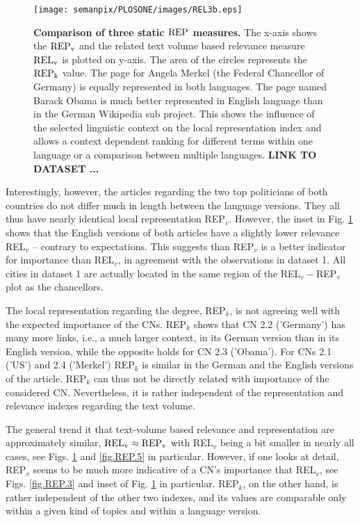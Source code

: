 \documentclass[a4paper,10pt]{scrbook}
\begin{document}
\begin{figure}[!b]
\begin{center}
\texttt{[image: semanpix/PLOSONE/images/REL3b.eps]}
\end{center}
\caption{
{\bf Comparison of three static $\rm REP$ measures.} The x-axis shows the $\rm
REP_v$ and the related text volume based relevance measure $\rm
REL_v$ is plotted on y-axis. The area of the circles represents the
$\rm REP_{k}$ value. The page for Angela Merkel (the Federal Chancellor of
Germany) is equally represented in both languages. The page named
Barack Obama is much better represented in English language than in the German Wikipedia sub project. This
shows the influence of the selected linguistic context on the local
representation index and allows a context dependent ranking for different terms
within one language or a comparison between multiple languages.
\textbf{LINK TO DATASET ...}}
\label{fig.REP.4}
\end{figure}


Interestingly, however, the articles regarding the two top politicians of 
both countries do not differ much in length between the language versions. 
They all thus have nearly identical local representation REP$_v$. However, 
the inset in Fig. \ref{fig.REP.4} shows that the English versions of both articles have 
a slightly lower relevance REL$_v$ -- contrary to expectations. This 
suggests than REP$_v$ is a better indicator for importance than REL$_v$,
in agreement with the observations in dataset 1. All cities in dataset 1 
are actually located in the same region of the REL$_v-$REP$_v$ plot as the 
chancellors. 

The local representation regarding the degree, REP$_k$, is not agreeing well 
with the expected importance of the CNs. REP$_k$ shows that CN 2.2 ('Germany') 
has many more links, i.e., a much larger context, in its German version than 
in its English version, while the opposite holds for CN 2.3 ('Obama'). For 
CNs 2.1 ('US') and 2.4 ('Merkel') REP$_k$ is similar in the German and the 
English versions of the article. REP$_k$ can thus not be directly related 
with importance of the considered CN. Nevertheless, it is rather independent 
of the representation and relevance indexes regarding the text volume.

The general trend it that text-volume based relevance and representation are 
approximately similar, $\rm REL_{v} \approx \rm REP_{v}$ with REL$_v$ being a 
bit smaller in nearly all cases, see Figs. \ref{fig.REP.4} and \ref{fig.REP.5} in particular. However, 
if one looks at detail, REP$_v$ seems to be much more indicative of a CN's 
importance that REL$_v$, see Figs. \ref{fig.REP.3} and inset of Fig. \ref{fig.REP.4} in particular. 
REP$_k$, on the other hand, is rather independent of the other two indexes, 
and its values are comparable only within a given kind of topics and within a 
language version.
\end{document}
